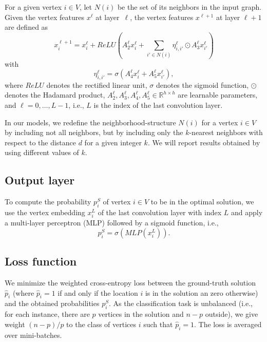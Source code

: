 \documentclass[]{article}
\begin{document}
For a given vertex $i \in V$, let $N(i)$ be the set of its neighbors in the 
input graph. Given the vertex features $x^\ell$ at layer~$\ell$, the vertex 
features $x^{\ell+1}$ at 
layer 
$\ell+1$ are defined as 
\begin{equation*}
x^{\ell+1}_{i}= x^\ell_i+ReLU(A^\ell_2 x^\ell_i+ \sum_{i' \in N(i)} 
\eta_{i,i'}^\ell \odot A_3^\ell x^\ell_{i'})
\end{equation*}
with
\begin{equation*}
\eta^\ell_{i,i'}=\sigma(A_4^\ell x_i^\ell +A_5^\ell x_{i'}^\ell), 
\end{equation*} 
where $ReLU$ denotes the rectified linear unit, $\sigma$ denotes the sigmoid 
function, $\odot$ denotes the Hadamard product, $A_2^\ell, A_3^\ell, A_4^\ell, 
A_5^\ell \in \mathbb 
R^{h \times h}$ are learnable parameters, and $\ell = 0, \dots, L-1$, i.e., 
$L$ is the index of the last convolution layer.

In our models, we redefine the 
neighborhood-structure $N(i)$ for a vertex $i \in V$ by including not all 
neighbors, but by including only the $k$-nearest neighbors with respect to the 
distance $d$ for a given integer $k$. We will report results obtained by using 
different 
values of $k$.

\subsection{Output layer}

To compute the probability $p^S_i$ of vertex $i \in V$ to be in the optimal 
solution, we 
use the vertex embedding $x^L_i$ of the last convolution layer with index $L$ 
and apply a 
multi-layer perceptron (MLP) followed by a sigmoid function, i.e., 
\begin{equation*}
p^S_i = \sigma(MLP(x^L_i)).
\end{equation*}

\subsection{Loss function}

We minimize the weighted cross-entropy loss between the ground-truth solution 
$\hat p_i$ (where $\hat p_i=1$ if and only if the location $i$ is in the 
solution an zero 
otherwise) and the obtained probabilities $p^S_i$. As the classification task 
is unbalanced (i.e., for each 
instance, there are $p$ vertices in the solution and $n-p$ outside), we give 
weight $(n-p)/p$ to the class of vertices $i$ such that $\hat p_i=1$.
 The loss is averaged over mini-batches.
\end{document}
